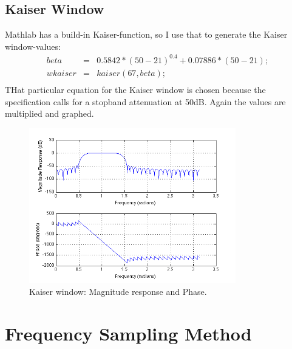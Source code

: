\documentclass[a4wide,10pt]{article}
\begin{document}
		\subsection{Kaiser Window} %
		\label{sub:kaiser_window}
		Mathlab has a build-in Kaiser-function, so I use that to generate the Kaiser window-values:
		\begin{eqnarray}
			beta &=& 0.5842*(50-21)^{0.4}+0.07886*(50-21); \nonumber \\
			wkaiser &=& kaiser(67, beta); \nonumber \\
		\end{eqnarray}
		THat particular equation for the Kaiser window is chosen because the specification calls for a stopband attenuation at 50dB.
		Again the values are multiplied and graphed.
		\begin{figure}[h]
			\centering
				\includegraphics[width=9cm]{images/opgave_2_c.png}
			\caption{Kaiser window: Magnitude response and Phase.}
			\label{fig:images_opgave_2_c}
		\end{figure}
		
	
\newpage
	\section{Frequency Sampling Method} %
	\label{sec:frequency_sampling_method}
\end{document}
